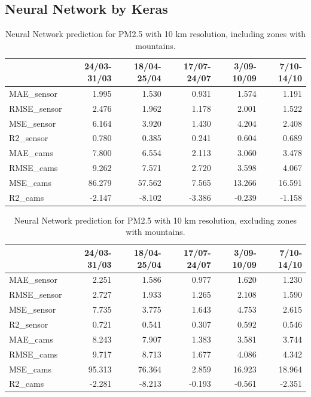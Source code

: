 \subsection{Neural Network by Keras}
\begin{table}[H]
\begin{tabular}{lrrrrr}
\toprule
 &  24/03-31/03 &  18/04-25/04 &  17/07-24/07 &  3/09-10/09 &  7/10-14/10 \\
\midrule
 MAE\_sensor &        1.995 &        1.530 &        0.931 &       1.574 &       1.191 \\
RMSE\_sensor &        2.476 &        1.962 &        1.178 &       2.001 &       1.522 \\
 MSE\_sensor &        6.164 &        3.920 &        1.430 &       4.204 &       2.408 \\
  R2\_sensor &        0.780 &        0.385 &        0.241 &       0.604 &       0.689 \\
   MAE\_cams &        7.800 &        6.554 &        2.113 &       3.060 &       3.478 \\
  RMSE\_cams &        9.262 &        7.571 &        2.720 &       3.598 &       4.067 \\
   MSE\_cams &       86.279 &       57.562 &        7.565 &      13.266 &      16.591 \\
    R2\_cams &       -2.147 &       -8.102 &       -3.386 &      -0.239 &      -1.158 \\
\bottomrule
\end{tabular}
\caption{Neural Network prediction for PM2.5 with 10 km resolution, including zones with mountains.}
\end{table}
\begin{table}[H]
\begin{tabular}{lrrrrr}
\toprule
 &  24/03-31/03 &  18/04-25/04 &  17/07-24/07 &  3/09-10/09 &  7/10-14/10 \\
\midrule
 MAE\_sensor &        2.251 &        1.586 &        0.977 &       1.620 &       1.230 \\
RMSE\_sensor &        2.727 &        1.933 &        1.265 &       2.108 &       1.590 \\
 MSE\_sensor &        7.735 &        3.775 &        1.643 &       4.753 &       2.615 \\
  R2\_sensor &        0.721 &        0.541 &        0.307 &       0.592 &       0.546 \\
   MAE\_cams &        8.243 &        7.907 &        1.383 &       3.581 &       3.744 \\
  RMSE\_cams &        9.717 &        8.713 &        1.677 &       4.086 &       4.342 \\
   MSE\_cams &       95.313 &       76.364 &        2.859 &      16.923 &      18.964 \\
    R2\_cams &       -2.281 &       -8.213 &       -0.193 &      -0.561 &      -2.351 \\
\bottomrule
\end{tabular}
\caption{Neural Network prediction for PM2.5 with 10 km resolution, excluding zones with mountains.}
\end{table}
